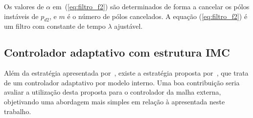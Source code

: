   Os valores de $\alpha$ em~(\ref{eq:filtro_f2}) são determinados de forma a cancelar os pólos instáveis de $p_{d2}$, e $m$ é o número de pólos cancelados. A equação (\ref{eq:filtro_f2}) é um filtro com constante de tempo $\lambda$ ajustável.

  \subsection{Controlador adaptativo com estrutura IMC}

  Além da estratégia apresentada por~\cite{ref:LEE}, existe a estratégia proposta por~\cite{ref:DATTA}, que trata de um controlador adaptativo por modelo interno. Uma boa contribuição seria avaliar a utilização desta proposta para o controlador da malha externa, objetivando uma abordagem mais simples em relação à apresentada neste trabalho.



